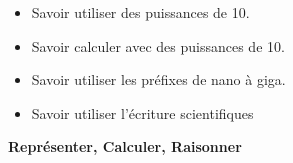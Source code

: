 \begin{myobj}
	\begin{itemize}
		
		\item Savoir utiliser des puissances de 10.
		\item Savoir calculer avec des puissances de 10.
		\item Savoir utiliser les préfixes de nano à giga.
		\item Savoir utiliser l'écriture scientifiques 
			
	\end{itemize}
\end{myobj}


\begin{mycomp}
	\textbf{Représenter, Calculer, Raisonner}
\end{mycomp}


